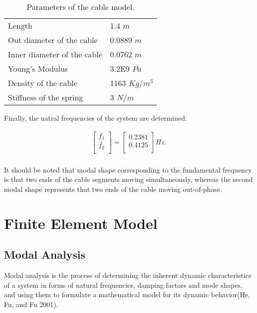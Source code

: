 \documentclass[paper=a4, fontsize=11pt]{scrartcl} %
\numberwithin{equation}{section} %
\numberwithin{figure}{section} %
\numberwithin{table}{section} %
\begin{document}
\begin{table}
  \centering
  \begin{tabular}{ll}
    \hline    
    Length	&   1.4 $m$ \\
    Out diameter of the cable &	0.0889 $m$ \\
    Inner diameter of the cable &	0.0762 $m$ \\
    Young's Modulus	& 3.2E9 $Pa$\\
    Density of the cable & 	 1163 $Kg/m^{3}$\\
    Stiffness of the spring	 &  3 $N/m$ \\
    \hline
  \end{tabular}
  \caption{Parameters of the cable model.}
  \label{tab:cable-parameter}
\end{table}

Finally, the natral frequencies of the system are determined:

\begin{align}
\left[\begin{matrix}f_1\\f_2\\\end{matrix}\right]=\left[\begin{matrix}0.2381\\0.4125\\\end{matrix}\right]
  Hz.\\
\end{align}

It should be noted that modal shape corresponding to the fundamental
frequency is that two ends of the cable segments moving
simultaneously, whereas the second modal shape represents that two
ends of the cable moving out-of-phase.

\section{Finite Element Model}
\label{sec:finite-element-model}

\subsection{Modal Analysis}
\label{sec:modal-analysis}

Modal analysis is the process of determining the inherent dynamic
characteristics of a system in forms of natural frequencies, damping
factors and mode shapes, and using them to formulate a mathematical
model for its dynamic behavior(He, Fu, and Fu 2001).
\end{document}
